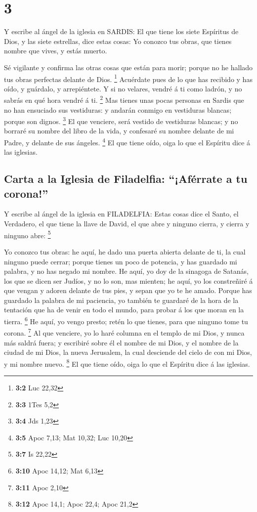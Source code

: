 \hypertarget{section-2}{%
\section{3}\label{section-2}}

 Y escribe al ángel de la iglesia en SARDIS: El que tiene
los siete Espíritus de Dios, y las siete estrellas, dice estas cosas: Yo
conozco tus obras, que tienes nombre que vives, y estás muerto.

 Sé vigilante y confirma las otras cosas que están para
morir; porque no he hallado tus obras perfectas delante de Dios.
\footnote{\textbf{3:2} Luc 22,32}  Acuérdate pues de lo
que has recibido y has oído, y guárdalo, y arrepiéntete. Y si no
velares, vendré á ti como ladrón, y no sabrás en qué hora vendré á ti.
\footnote{\textbf{3:3} 1Tes 5,2}  Mas tienes unas pocas
personas en Sardis que no han ensuciado sus vestiduras: y andarán
conmigo en vestiduras blancas; porque son dignos. \footnote{\textbf{3:4}
  Jds 1,23}  El que venciere, será vestido de vestiduras
blancas; y no borraré su nombre del libro de la vida, y confesaré su
nombre delante de mi Padre, y delante de sus ángeles. \footnote{\textbf{3:5}
  Apoc 7,13; Mat 10,32; Luc 10,20}  El que tiene oído,
oiga lo que el Espíritu dice á las iglesias.

\hypertarget{carta-a-la-iglesia-de-filadelfia-afuxe9rrate-a-tu-corona}{%
\subsection{Carta a la Iglesia de Filadelfia: ``¡Aférrate a tu
corona!''}\label{carta-a-la-iglesia-de-filadelfia-afuxe9rrate-a-tu-corona}}

 Y escribe al ángel de la iglesia en FILADELFIA: Estas
cosas dice el Santo, el Verdadero, el que tiene la llave de David, el
que abre y ninguno cierra, y cierra y ninguno abre: \footnote{\textbf{3:7}
  Is 22,22}

 Yo conozco tus obras: he aquí, he dado una puerta abierta
delante de ti, la cual ninguno puede cerrar; porque tienes un poco de
potencia, y has guardado mi palabra, y no has negado mi nombre.
 He aquí, yo doy de la sinagoga de Satanás, los que se
dicen ser Judíos, y no lo son, mas mienten; he aquí, yo los constreñiré
á que vengan y adoren delante de tus pies, y sepan que yo te he amado.
 Porque has guardado la palabra de mi paciencia, yo
también te guardaré de la hora de la tentación que ha de venir en todo
el mundo, para probar á los que moran en la tierra. \footnote{\textbf{3:10}
  Apoc 14,12; Mat 6,13}  He aquí, yo vengo presto; retén
lo que tienes, para que ninguno tome tu corona. \footnote{\textbf{3:11}
  Apoc 2,10}  Al que venciere, yo lo haré columna en el
templo de mi Dios, y nunca más saldrá fuera; y escribiré sobre él el
nombre de mi Dios, y el nombre de la ciudad de mi Dios, la nueva
Jerusalem, la cual desciende del cielo de con mi Dios, y mi nombre
nuevo. \footnote{\textbf{3:12} Apoc 14,1; Apoc 22,4; Apoc 21,2}
 El que tiene oído, oiga lo que el Espíritu dice á las
iglesias.

